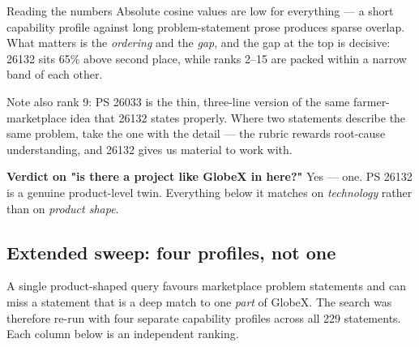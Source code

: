 \documentclass[11pt]{article}
\begin{document}
\begin{minipage}[t]{0.42\textwidth}
\vspace{0pt}
\begin{callout}{Reading the numbers}
Absolute cosine values are low for everything --- a short capability profile against long
problem-statement prose produces sparse overlap. What matters is the \emph{ordering} and the
\emph{gap}, and the gap at the top is decisive: 26132 sits 65\% above second place, while ranks 2--15
are packed within a narrow band of each other.

\vspace{0.5em}
Note also rank 9: PS 26033 is the thin, three-line version of the same farmer-marketplace idea that
26132 states properly. Where two statements describe the same problem, take the one with the
detail --- the rubric rewards root-cause understanding, and 26132 gives us material to work with.
\end{callout}
\end{minipage}

\vspace{0.8em}
\noindent\textbf{Verdict on "is there a project like GlobeX in here?"} Yes --- one. PS 26132 is a genuine
product-level twin. Everything below it matches on \emph{technology} rather than on \emph{product shape}.

\subsection*{Extended sweep: four profiles, not one}
A single product-shaped query favours marketplace problem statements and can miss a statement that is a
deep match to one \emph{part} of GlobeX. The search was therefore re-run with four separate capability
profiles across all 229 statements. Each column below is an independent ranking.
\end{document}
